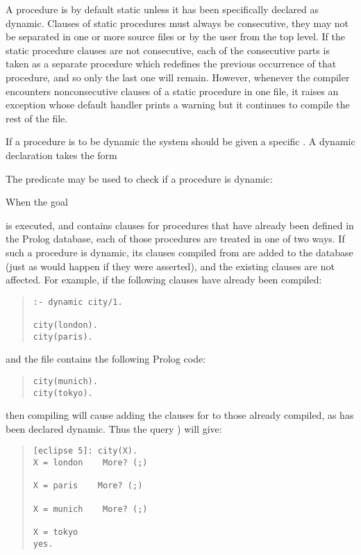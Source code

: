 A procedure is by default static unless it has been specifically declared as
dynamic.
Clauses of static procedures must always be consecutive,
they may not
be separated in one or more source files or by the user from the top level.
If the static procedure clauses are not consecutive, each of the
consecutive parts is taken as a separate procedure which redefines
the previous occurrence of that procedure, and so only the last one will
remain.
However, whenever the compiler encounters nonconsecutive clauses of a static
procedure in one file, it raises an exception whose default handler
prints a warning but it continues to compile the rest of the file.

If a procedure is to be dynamic the {\eclipse} system should be
given a specific .
A dynamic declaration takes the form
\begin{quote}
\end{quote}
The predicate 
may be used to check if a procedure
is dynamic:
\begin{quote}
\end{quote}

When the goal
\begin{quote}
\end{quote}
is executed,
and  contains clauses for procedures that have
already been defined
in the Prolog database, each of those procedures are treated in one of two ways.
If such a procedure is dynamic, its clauses compiled from 
are added to the database (just as would happen if they were asserted),
and the existing clauses are not affected.
For example, if the following
clauses have already been compiled:
\begin{quote}
\begin{verbatim}
:- dynamic city/1.

city(london).
city(paris).
\end{verbatim}
\end{quote}
and the file  contains the
following Prolog code:
\begin{quote}
\begin{verbatim}
city(munich).
city(tokyo).
\end{verbatim}
\end{quote}
then compiling  will cause adding
the clauses for  to those
already compiled, as  has been declared dynamic.
Thus the query  ) will give:
\begin{quote}
\begin{verbatim}
[eclipse 5]: city(X).
X = london    More? (;)

X = paris    More? (;)

X = munich    More? (;)

X = tokyo
yes.
\end{verbatim}
\end{quote}


